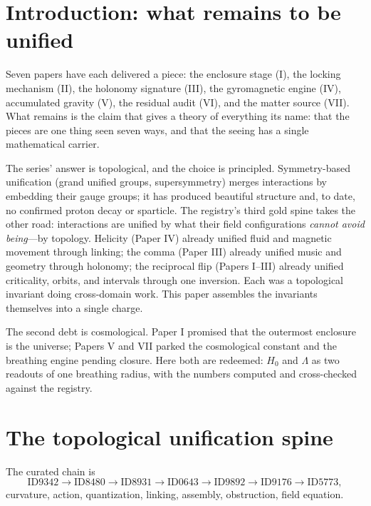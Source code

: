\documentclass[11pt]{article}
\theoremstyle{remark}
\begin{document}
\section{Introduction: what remains to be unified}
\label{sec:intro}

Seven papers have each delivered a piece: the enclosure stage (I), the locking mechanism (II), the holonomy signature (III), the gyromagnetic engine (IV), accumulated gravity (V), the residual audit (VI), and the matter source (VII). What remains is the claim that gives a theory of everything its name: that the pieces are one thing seen seven ways, and that the seeing has a single mathematical carrier.

The series' answer is topological, and the choice is principled. Symmetry-based unification (grand unified groups, supersymmetry) merges interactions by embedding their gauge groups; it has produced beautiful structure and, to date, no confirmed proton decay or sparticle. The registry's third gold spine takes the other road: interactions are unified by what their field configurations \emph{cannot avoid being}---by topology. Helicity (Paper IV) already unified fluid and magnetic movement through linking; the comma (Paper III) already unified music and geometry through holonomy; the reciprocal flip (Papers I--III) already unified criticality, orbits, and intervals through one inversion. Each was a topological invariant doing cross-domain work. This paper assembles the invariants themselves into a single charge.

The second debt is cosmological. Paper I promised that the outermost enclosure is the universe; Papers V and VII parked the cosmological constant and the breathing engine pending closure. Here both are redeemed: $H_0$ and $\Lambda$ as two readouts of one breathing radius, with the numbers computed and cross-checked against the registry.

\section{The topological unification spine}
\label{sec:topo}

The curated chain is
\begin{equation*}
\text{ID9342} \to \text{ID8480} \to \text{ID8931} \to \text{ID0643} \to \text{ID9892} \to \text{ID9176} \to \text{ID5773},
\end{equation*}
curvature, action, quantization, linking, assembly, obstruction, field equation.
\end{document}
